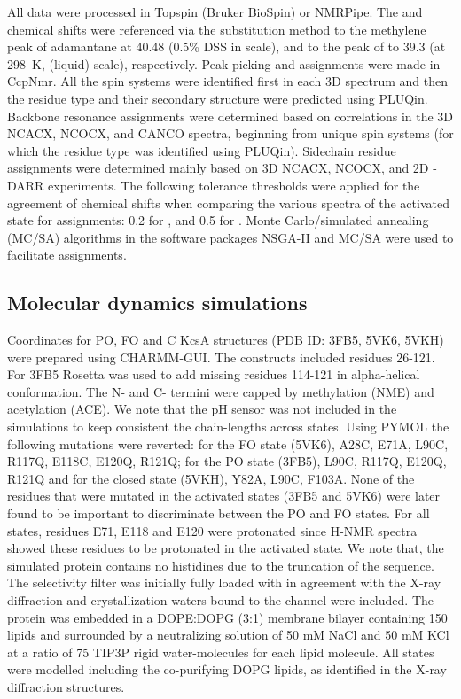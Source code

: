 \documentclass[%
 aip,
 amsmath,amssymb,
 preprint,%
]{revtex4-1}
\begin{document}
All data were processed in Topspin (Bruker BioSpin) or NMRPipe.\cite{Delaglio1995} The  and  chemical shifts were referenced via the substitution method to the methylene peak of adamantane at \SI{40.48}{\ppm} (0.5\% DSS in  scale), and to the peak of   to \SI{39.3 }{\ppm} (at \SI{298}{\kelvin},  (liquid) scale), respectively.\cite{Morcombe2003,McDermott2007,Harris2008,Bertani2014} Peak picking and assignments were made in CcpNmr.\cite{Vranken2005} All the spin systems were identified first in each 3D spectrum and then the residue type and their secondary structure were predicted using PLUQin.\cite{Fritzsching2016} Backbone resonance assignments were determined based on correlations in the 3D NCACX, NCOCX, and CANCO spectra, beginning from unique spin systems (for which the residue type was identified using PLUQin). Sidechain residue assignments were determined mainly based on 3D NCACX, NCOCX, and 2D - DARR experiments. The following tolerance thresholds were applied for the agreement of chemical shifts when comparing the various spectra of the activated state for assignments: \SI{0.2}{\ppm} for , and \SI{0.5}{\ppm} for . Monte Carlo/simulated annealing (MC/SA) algorithms in the software packages NSGA-II and MC/SA were used to facilitate assignments.\cite{Yang2013}

\subsection{Molecular dynamics simulations}
Coordinates for PO, FO and C KcsA structures (PDB ID: 3FB5, 5VK6, 5VKH)\cite{Cuello2010,Cuello2017} were prepared using CHARMM-GUI\cite{Jo2017}. The constructs included residues 26-121. For 3FB5 Rosetta\cite{DiMaio2011} was used to add missing residues 114-121 in alpha-helical conformation. The N- and C- termini were capped by methylation (NME) and acetylation (ACE). We note that the pH sensor was not included in the simulations to keep consistent the chain-lengths across states. Using PYMOL\cite{PyMOL} the following mutations were reverted: for the FO state (5VK6), A28C, E71A, L90C, R117Q, E118C, E120Q, R121Q; for the PO state (3FB5), L90C, R117Q, E120Q, R121Q and for the closed state (5VKH), Y82A, L90C, F103A. None of the residues that were mutated in the activated states (3FB5 and 5VK6) were later found to be important to discriminate between the PO and FO states. For all states, residues E71, E118 and E120 were protonated since H-NMR spectra showed these residues to be protonated in the activated state.\cite{Bhate2012,Wylie2014} We note that, the simulated protein contains no histidines due to the truncation of the sequence. The selectivity filter was initially fully loaded with  in agreement with the X-ray diffraction and crystallization waters bound to the channel were included. The protein was embedded in a DOPE:DOPG (3:1) membrane bilayer containing 150 lipids and surrounded by a neutralizing solution of 50 mM NaCl and 50 mM KCl at a ratio of 75 TIP3P\cite{TIP3P_JChemPhys_Jorgensen_1983} rigid water-molecules for each lipid molecule. All states were modelled including the co-purifying DOPG lipids, as identified in the X-ray diffraction structures. 
\end{document}
